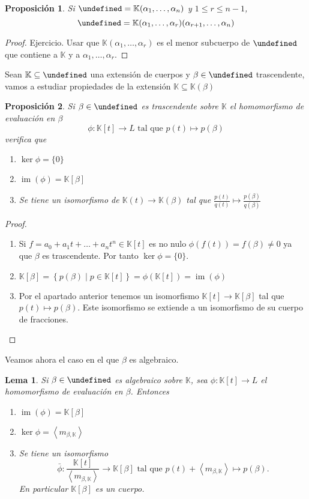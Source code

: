 \documentclass[10pt, spanish]{report}
\newtheorem*{lema}{Lema}
\newtheorem*{prop}{Proposición}
\theoremstyle{definition}
\newcommand{\K}{\mathbb{K}}
\let\L\undefined
\newcommand{\L}{\mathbb{L}}
\newcommand{\im}[1]{\operatorname{im}\left(#1\right)}
\renewcommand{\leq}{\leqslant}
\begin{document}
\begin{prop}
Si $\L=\K(\alpha_1,\ldots,\alpha_n)$ y $1\leq r\leq
n-1$,\[\L=\K(\alpha_1,\ldots,\alpha_r)(\alpha_{r+1},\ldots,\alpha_n)\]
\end{prop}

\begin{proof}
    Ejercicio. Usar que $\K(\alpha_1,\ldots,\alpha_r)$ es el menor subcuerpo de
    $\L$ que contiene a $\K$ y a $\alpha_1,\ldots,\alpha_r$.
\end{proof}

Sean $\K\subseteq\L$ una extensión de cuerpos y $\beta\in\L$ trascendente, vamos
a estudiar propiedades de la extensión $\K\subseteq\K(\beta)$

\begin{prop}
    Si $\beta\in\L$ es trascendente sobre $\K$ el homomorfismo de evaluación en
    $\beta$ \[\phi:\K[t]\to L \text{ tal que } p(t)\mapsto p(\beta)\] verifica
    que
    \begin{enumerate}
        \item $\ker{\phi}=\{0\}$
        \item $\im{\phi}=\K[\beta]$
        \item Se tiene un isomorfismo de $\K(t)\to \K(\beta)$ tal que
            $\frac{p(t)}{q(t)}\mapsto \frac{p(\beta)}{q(\beta)}$
    \end{enumerate}
\end{prop}

\begin{proof}\hspace{0pt}
    \begin{enumerate}
        \item Si $f=a_0+a_1t+\ldots+a_nt^n\in\K[t]$ es no nulo
            $\phi(f(t))=f(\beta)\neq0$ ya que $\beta$ es trascendente. Por tanto
            $\ker{\phi}=\{0\}$.
        \item $\K[\beta]=\left\{ p(\beta)\mid
            p\in\K[t]\right\}=\phi(\K[t])=\im{\phi}$
        \item Por el apartado anterior tenemos un isomorfismo
            $\K[t]\to \K[\beta]$  tal que $p(t)\mapsto p(\beta)$. Este
            isomorfismo se extiende a un isomorfismo de su cuerpo de fracciones.
    \end{enumerate}
\end{proof}

Veamos ahora el caso en el que $\beta$ es algebraico.

\begin{lema}
    Si $\beta\in\L$ es algebraico sobre $\K$, sea $\phi:\K[t]\to L$ el
    homomorfismo de evaluación en $\beta$. Entonces
    \begin{enumerate}
        \item $\im{\phi}=\K[\beta]$
        \item $\ker{\phi}=\left<m_{\beta,\K}\right>$
        \item Se tiene un isomorfismo \[\bar{\phi}:\frac{\K[t]}{\left<
            m_{\beta,\K} \right> }\to \K[\beta] \text{ tal que } p(t)+\left<
        m_{\beta,\K} \right> \mapsto p(\beta).\]
        En particular $\K[\beta]$ es un cuerpo.
    \end{enumerate}
\end{lema}
\end{document}
